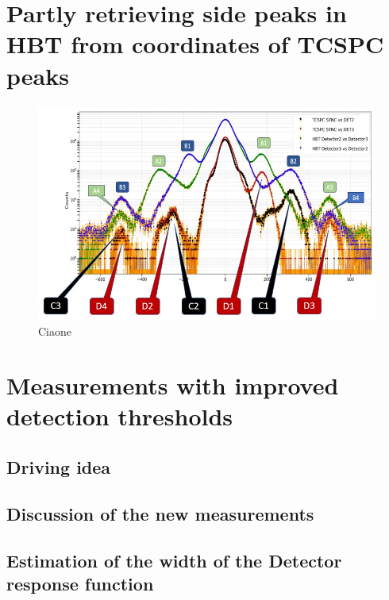 \section{Partly retrieving side peaks in HBT from coordinates of TCSPC peaks}

\begin{figure}[hbtp]
\centering
\includegraphics[width=1\textwidth]{Khaos_Labeled.jpg}
\caption{Ciaone}
\label{Khaos_labeled}
\end{figure}
\section{Measurements with improved detection thresholds}
\subsection{Driving idea}
\subsection{Discussion of the new measurements}
\subsection{Estimation of the width of the Detector response function}